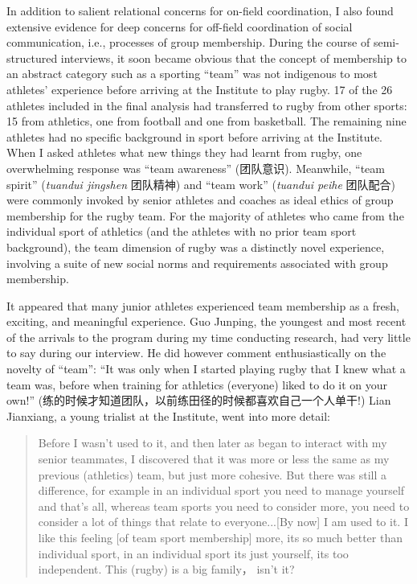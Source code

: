 \begin{CJK}{UTF8}{gbsn}
In addition to salient relational concerns for on-field coordination, I also found extensive evidence for deep concerns for off-field coordination of social communication, i.e., processes of group membership.  During the course of semi-structured interviews, it soon became obvious that the concept of membership to an abstract category such as a sporting ``team'' was not indigenous to most athletes' experience before arriving at the Institute to play rugby.  17 of the 26 athletes included in the final analysis had transferred to rugby from other sports: 15 from athletics, one from football and one from basketball.  The remaining nine athletes had no specific background in sport before arriving at the Institute.
When I asked athletes what new things they had learnt from rugby, one overwhelming response was ``team awareness'' (团队意识).
Meanwhile, ``team spirit'' (\textit{tuandui jingshen} 团队精神) and ``team work'' (\textit{tuandui peihe} 团队配合) were commonly invoked by senior athletes and coaches as ideal ethics of group membership for the rugby team. For the majority of athletes who came from the individual sport of athletics (and the athletes with no prior team sport background), the team dimension of rugby was a distinctly novel experience, involving a suite of new social norms and requirements associated with group membership.

It appeared that many junior athletes experienced team membership as a fresh, exciting, and meaningful experience.  Guo Junping, the youngest and most recent of the arrivals to the program during my time conducting research, had very little to say during our interview.  He did however comment enthusiastically on the novelty of ``team'': ``It was only when I started playing rugby that I knew what a team was, before when training for athletics (everyone) liked to do it on your own!'' (练的时候才知道团队，以前练田径的时候都喜欢自己一个人单干!) Lian Jianxiang, a young trialist at the Institute, went into more detail:

  \begin{quote}
   Before I wasn't used to it, and then later as began to interact with my senior teammates, I discovered that it was more or less the same as my previous (athletics) team, but just more cohesive.  But there was still a difference, for example in an individual sport you need to manage yourself and that's all, whereas team sports you need to consider more, you need to consider a lot of things that relate to everyone...[By now] I am used to it. I like this feeling [of team sport membership] more, its so much better than individual sport, in an individual sport its just yourself, its too independent. This (rugby) is a big family， isn't it?
  \end{quote}


\end{CJK}
